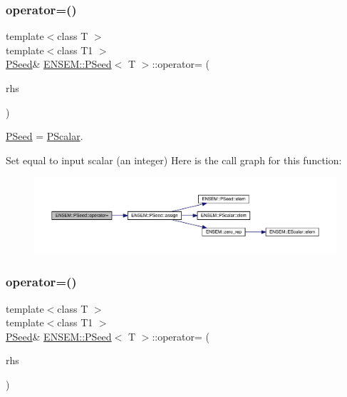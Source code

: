 \subsubsection{\texorpdfstring{operator=()}{operator=()}\hspace{0.1cm}{\footnotesize\ttfamily [2/4]}}
{\footnotesize\ttfamily template$<$class T $>$ \\
template$<$class T1 $>$ \\
\mbox{\hyperlink{classENSEM_1_1PSeed}{P\+Seed}}\& \mbox{\hyperlink{classENSEM_1_1PSeed}{E\+N\+S\+E\+M\+::\+P\+Seed}}$<$ T $>$\+::operator= (\begin{DoxyParamCaption}\item[{const \mbox{\hyperlink{classENSEM_1_1PScalar}{P\+Scalar}}$<$ T1 $>$ \&}]{rhs }\end{DoxyParamCaption})\hspace{0.3cm}{\ttfamily [inline]}}



\mbox{\hyperlink{classENSEM_1_1PSeed}{P\+Seed}} = \mbox{\hyperlink{classENSEM_1_1PScalar}{P\+Scalar}}. 

Set equal to input scalar (an integer) Here is the call graph for this function\+:
\nopagebreak
\begin{figure}[H]
\begin{center}
\leavevmode
\includegraphics[width=350pt]{dc/d14/classENSEM_1_1PSeed_aa7d9ec1f6a7cca8ee109c29d75482350_cgraph}
\end{center}
\end{figure}
\mbox{\label{classENSEM_1_1PSeed_a22c88645227bfddbfea703ed71117795}} 
\subsubsection{\texorpdfstring{operator=()}{operator=()}\hspace{0.1cm}{\footnotesize\ttfamily [3/4]}}
{\footnotesize\ttfamily template$<$class T $>$ \\
template$<$class T1 $>$ \\
\mbox{\hyperlink{classENSEM_1_1PSeed}{P\+Seed}}\& \mbox{\hyperlink{classENSEM_1_1PSeed}{E\+N\+S\+E\+M\+::\+P\+Seed}}$<$ T $>$\+::operator= (\begin{DoxyParamCaption}\item[{const \mbox{\hyperlink{classENSEM_1_1PSeed}{P\+Seed}}$<$ T1 $>$ \&}]{rhs }\end{DoxyParamCaption})\hspace{0.3cm}{\ttfamily [inline]}}



